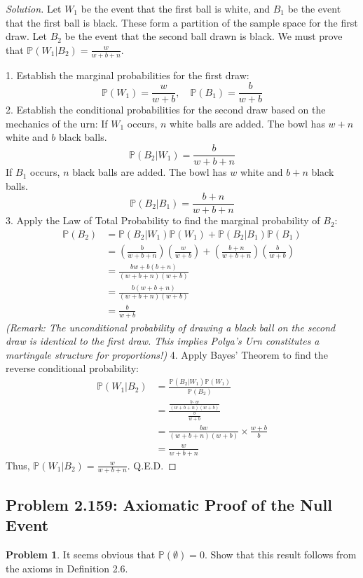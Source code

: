 \documentclass[11pt]{article}
\theoremstyle{definition}
\newtheorem{problem}{Problem}[section]
\theoremstyle{remark}
\newcommand{\Prob}{\mathbb{P}}
\begin{document}
\begin{proof}[Solution]
Let $W_1$ be the event that the first ball is white, and $B_1$ be the event that the first ball is black. These form a partition of the sample space for the first draw. Let $B_2$ be the event that the second ball drawn is black. We must prove that $\Prob(W_1 | B_2) = \frac{w}{w+b+n}$.

1. Establish the marginal probabilities for the first draw:
   \[ \Prob(W_1) = \frac{w}{w+b}, \quad \Prob(B_1) = \frac{b}{w+b} \]
2. Establish the conditional probabilities for the second draw based on the mechanics of the urn:
   If $W_1$ occurs, $n$ white balls are added. The bowl has $w+n$ white and $b$ black balls.
   \[ \Prob(B_2 | W_1) = \frac{b}{w+b+n} \]
   If $B_1$ occurs, $n$ black balls are added. The bowl has $w$ white and $b+n$ black balls.
   \[ \Prob(B_2 | B_1) = \frac{b+n}{w+b+n} \]
3. Apply the Law of Total Probability to find the marginal probability of $B_2$:
   \begin{align*}
       \Prob(B_2) &= \Prob(B_2 | W_1)\Prob(W_1) + \Prob(B_2 | B_1)\Prob(B_1) \\
                  &= \left( \frac{b}{w+b+n} \right)\left( \frac{w}{w+b} \right) + \left( \frac{b+n}{w+b+n} \right)\left( \frac{b}{w+b} \right) \\
                  &= \frac{bw + b(b+n)}{(w+b+n)(w+b)} \\
                  &= \frac{b(w + b + n)}{(w+b+n)(w+b)} \\
                  &= \frac{b}{w+b}
   \end{align*}
   \textit{(Remark: The unconditional probability of drawing a black ball on the second draw is identical to the first draw. This implies Polya's Urn constitutes a martingale structure for proportions!)}
4. Apply Bayes' Theorem to find the reverse conditional probability:
   \begin{align*}
       \Prob(W_1 | B_2) &= \frac{\Prob(B_2 | W_1)\Prob(W_1)}{\Prob(B_2)} \\
                        &= \frac{ \frac{b \cdot w}{(w+b+n)(w+b)} }{ \frac{b}{w+b} } \\
                        &= \frac{bw}{(w+b+n)(w+b)} \times \frac{w+b}{b} \\
                        &= \frac{w}{w+b+n}
   \end{align*}
Thus, $\Prob(W_1 | B_2) = \frac{w}{w+b+n}$. Q.E.D.
\end{proof}

\subsection{Problem 2.159: Axiomatic Proof of the Null Event}
\begin{problem}
It seems obvious that $\Prob(\emptyset) = 0$. Show that this result follows from the axioms in Definition 2.6.
\end{problem}
\end{document}
